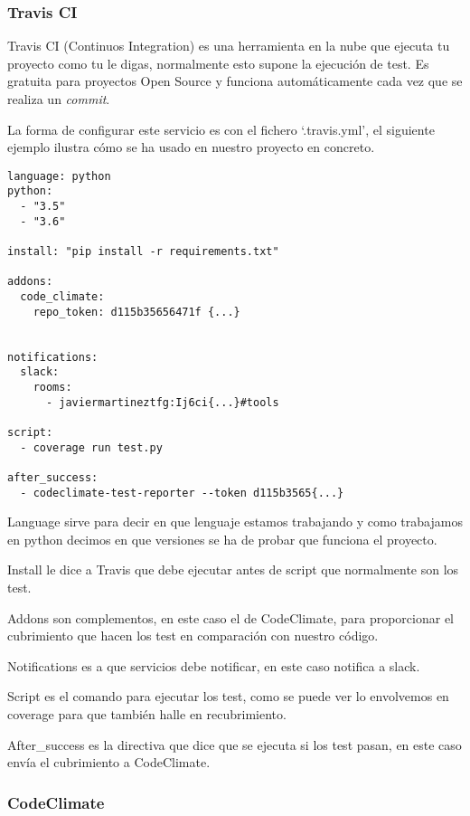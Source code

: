 \subsubsection{Travis CI}

Travis CI (Continuos Integration) es una herramienta en la nube que ejecuta tu proyecto como tu le digas, normalmente esto supone la ejecución de test. Es gratuita para proyectos Open Source y funciona automáticamente cada vez que se realiza un \emph{commit}.

La forma de configurar este servicio es con el fichero `.travis.yml', el siguiente ejemplo ilustra cómo se ha usado en nuestro proyecto en concreto.


\lstset{style=blockstyle}
\begin{lstlisting}[language=travisyml]
language: python
python:
  - "3.5"
  - "3.6"

install: "pip install -r requirements.txt"

addons:
  code_climate:
    repo_token: d115b35656471f {...}


notifications:
  slack:
    rooms:
      - javiermartineztfg:Ij6ci{...}#tools

script:
  - coverage run test.py

after_success:
  - codeclimate-test-reporter --token d115b3565{...}

\end{lstlisting}

Language sirve para decir en que lenguaje estamos trabajando y como trabajamos en python decimos en que versiones se ha de probar que funciona el proyecto.

Install le dice a Travis que debe ejecutar antes de script que normalmente son los test.

Addons son complementos, en este caso el de CodeClimate, para proporcionar el cubrimiento que hacen los test en comparación con nuestro código. 

Notifications es a que servicios debe notificar, en este caso notifica a slack.

Script es el comando para ejecutar los test, como se puede ver lo envolvemos en coverage para que también halle en recubrimiento.

After\_success es la directiva que dice que se ejecuta si los test pasan, en este caso envía el cubrimiento a CodeClimate.

\subsubsection{CodeClimate}

